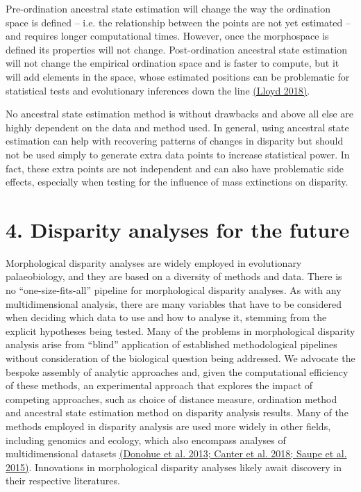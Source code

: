 Pre-ordination ancestral state estimation will change the way the
ordination space is defined -- i.e. the relationship between the points
are not yet estimated -- and requires longer computational times.
However, once the morphospace is defined its properties will not change.
Post-ordination ancestral state estimation will not change the empirical
ordination space and is faster to compute, but it will add elements in
the space, whose estimated positions can be problematic for statistical
tests and evolutionary inferences down the line
\href{https://paperpile.com/c/sTGYvp/53SJ}{(Lloyd 2018)}.

No ancestral state estimation method is without drawbacks and above all
else are highly dependent on the data and method used. In general, using
ancestral state estimation can help with recovering patterns of changes
in disparity but should not be used simply to generate extra data points
to increase statistical power. In fact, these extra points are not
independent and can also have problematic side effects, especially when
testing for the influence of mass extinctions on disparity.

\hypertarget{disparity-analyses-for-the-future}{%
\section{4. Disparity analyses for the
future}\label{disparity-analyses-for-the-future}}

Morphological disparity analyses are widely employed in evolutionary
palaeobiology, and they are based on a diversity of methods and data.
There is no ``one-size-fits-all'' pipeline for morphological disparity
analyses. As with any multidimensional analysis, there are many
variables that have to be considered when deciding which data to use and
how to analyse it, stemming from the explicit hypotheses being tested.
Many of the problems in morphological disparity analysis arise from
``blind'' application of established methodological pipelines without
consideration of the biological question being addressed. We advocate
the bespoke assembly of analytic approaches and, given the computational
efficiency of these methods, an experimental approach that explores the
impact of competing approaches, such as choice of distance measure,
ordination method and ancestral state estimation method on disparity
analysis results. Many of the methods employed in disparity analysis are
used more widely in other fields, including genomics and ecology, which
also encompass analyses of multidimensional datasets
\href{https://paperpile.com/c/sTGYvp/krNU+60H0+cV3v}{(Donohue et al.
2013; Canter et al. 2018; Saupe et al. 2015)}. Innovations in
morphological disparity analyses likely await discovery in their
respective literatures.

